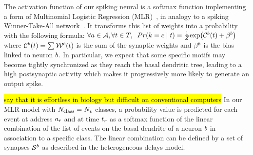 \documentclass[default]{sn-jnl}%
\theoremstyle{thmstyleone}%
\theoremstyle{thmstyletwo}%
\theoremstyle{thmstylethree}%
\newcommand{\note}[1]{{\sethlcolor{yellow}\hl{#1}}}
\begin{document}
The activation function of our spiking neural is a softmax function implementing a form of Multinomial Logistic Regression (MLR)~\citep{grimaldi_robust_2022}, in analogy to a spiking Winner-Take-All network~\citep{nessler_bayesian_2013}.
It transforms this list of weights into a probability with the following formula:
$
\forall a \in \mathcal{A}, \forall t \in T, \; \;
Pr(k=c \; \vert \; t) =
\frac 1 Z
{\exp  (\mathcal{C}^b(t) +\beta^b) }
$ 
where $\mathcal{C}^b(t) = \sum
\mathcal{W}^b(t)
$ is the sum of the synaptic weights and $\beta^b$ is the bias linked to neuron $b$. 
In particular, we expect that some specific motifs may become tightly synchronized as they reach the basal dendritic tree, leading to a high postsynaptic activity which makes it progressively more likely to generate an output spike.
%

 \note{say that it is effortless in biology but difficult on conventional computers}
 In our MLR model with $N_\text{class}=N_v$ classes, a probability value is predicted for each event at address $a_r$ and at time $t_r$ as a softmax function of the linear combination of the list of events on the basal dendrite of a neuron $b$ in association to a specific class. The linear combination can be defined by a set of synapses $\mathcal{S}^b$ as described in the heterogeneous delays model. 
\end{document}
